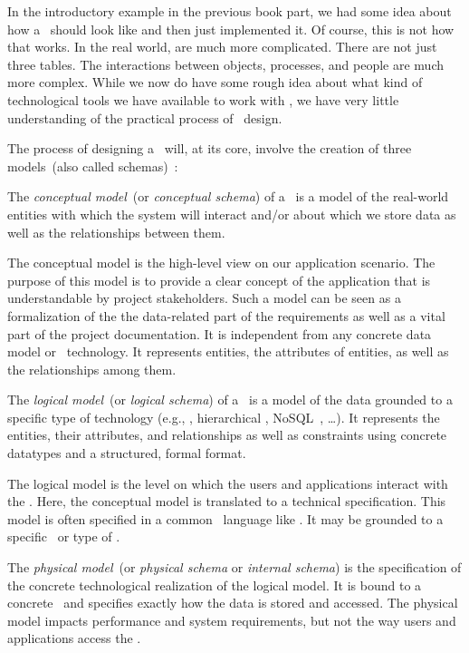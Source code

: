 %
%
In the introductory example in the previous book part, we had some idea about how a \db\ should look like and then just implemented it.
Of course, this is not how that works.
In the real world,  are much more complicated.
There are not just three tables.
The interactions between objects, processes, and people are much more complex.
While we now do have some rough idea about what kind of technological tools we have available to work with , we have very little understanding of the practical process of \db\ design.

The process of designing a \db\ will, at its core, involve the creation of three models~(also called schemas)~\cite{EN2015FODS}:%
%
\begin{definition}%
The \emph{conceptual model}~(or \emph{conceptual schema}) of a \db\ is a model of the real-world entities with which the system will interact and/or about which we store data as well as the relationships between them.%
\end{definition}%
%
The conceptual model is the high-level view on our application scenario.
The purpose of this model is to provide a clear concept of the application that is understandable by project stakeholders.
Such a model can be seen as a formalization of the the data-related part of the requirements as well as a vital part of the project documentation.
It is independent from any concrete data model or \db\ technology.
It represents entities, the attributes of entities, as well as the relationships among them.
%
\begin{definition}%
\label{def:logicalModel}%
The \emph{logical model}~(or \emph{logical schema}) of a \db\ is a model of the data grounded to a specific type of technology (e.g., , hierarchical \db, NoSQL~\db, \dots). %
It represents the entities, their attributes, and relationships as well as constraints using concrete datatypes and a structured, formal format.%
\end{definition}%
%
The logical model is the level on which the users and applications interact with the \db.
Here, the conceptual model is translated to a technical specification.
This model is often specified in a common \db\ language like \sql.
It may be grounded to a specific \dbms\ or type of \dbms.%
%
\begin{definition}%
The \emph{physical model}~(or \emph{physical schema} or \emph{internal schema}) is the specification of the concrete technological realization of the logical model. %
It is bound to a concrete \dbms\ and specifies exactly how the data is stored and accessed. %
The physical model impacts performance and system requirements, but not the way users and applications access the \db.%
\end{definition}%
